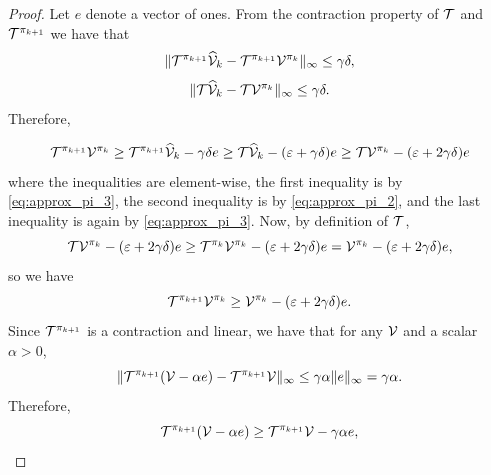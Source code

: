 \begin{proof}
    Let $e$ denote a vector of ones. From the contraction property of $\mathcal{T}$ and $\mathcal{T}^{\pi_{k+1}}$ we have that
    \begin{equation*}
        \| \mathcal{T}^{\pi_{k+1}} \widehat{\mathcal{V}}_k - \mathcal{T}^{\pi_{k+1}}\mathcal{V}^{\pi_k} \|_\infty \leq \gamma \delta,
    \end{equation*}
    \begin{equation*}
        \| \mathcal{T} \widehat{\mathcal{V}}_k - \mathcal{T}\mathcal{V}^{\pi_k} \|_\infty \leq \gamma \delta.
    \end{equation*}
    Therefore, 

    \begin{equation}\label{eq:approx_pi_3}
        \mathcal{T}^{\pi_{k+1}}\mathcal{V}^{\pi_k} \geq \mathcal{T}^{\pi_{k+1}}\widehat{\mathcal{V}}_k - \gamma \delta e \geq \mathcal{T}\widehat{\mathcal{V}}_k - (\varepsilon + \gamma \delta) e \geq \mathcal{T}\mathcal{V}^{\pi_k} - (\varepsilon + 2 \gamma \delta) e
    \end{equation}
    where the inequalities are element-wise, the first inequality is by \eqref{eq:approx_pi_3}, the second inequality is by \eqref{eq:approx_pi_2}, and the last inequality is again by \eqref{eq:approx_pi_3}.
    Now, by definition of $\mathcal{T}$,
    \begin{equation*}
        \mathcal{T}\mathcal{V}^{\pi_k} - (\varepsilon + 2 \gamma \delta) e \geq \mathcal{T}^{\pi_k}\mathcal{V}^{\pi_k} - (\varepsilon + 2 \gamma \delta) e = \mathcal{V}^{\pi_k} - (\varepsilon + 2 \gamma \delta) e,
    \end{equation*}
    so we have
    \begin{equation}\label{eq:approx_pi_4}
        \mathcal{T}^{\pi_{k+1}}\mathcal{V}^{\pi_k} \geq \mathcal{V}^{\pi_k} - (\varepsilon + 2 \gamma \delta) e.
    \end{equation}
    Since $\mathcal{T}^{\pi_{k+1}}$ is a contraction and linear, we have that for any $\mathcal{V}$ and a scalar $\alpha > 0$,
    \begin{equation*}
        \| \mathcal{T}^{\pi_{k+1}}(\mathcal{V} - \alpha e) - \mathcal{T}^{\pi_{k+1}}\mathcal{V} \|_\infty \leq \gamma \alpha \| e \|_\infty = \gamma \alpha.
    \end{equation*}
    Therefore, 
    \begin{equation}\label{eq:approx_pi_5}
        \operator^{\policy_{k+1}}(\Value - \alpha e) \geq \operator^{\policy_{k+1}}\Value - \discount \alpha e,

\end{equation}
\end{proof}
